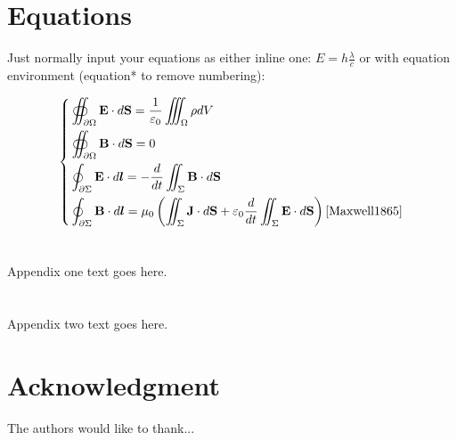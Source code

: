 \documentclass{article}
\begin{document}
\chapter{Equations}
Just normally input your equations as either inline one: $E=h\frac{\lambda}{c}$ or with equation environment (equation* to remove numbering):

\begin{equation}
\left\{
\begin{aligned}
    &\oiint_{\partial\Omega}{\mathbf{E}\cdot d\mathbf{S}}=\frac 1{\varepsilon_0}\iiint_\Omega{\rho dV}\\
    &\oiint_{\partial\Omega}{\mathbf{B}\cdot d\mathbf{S}}=0\\
    &\oint_{\partial\Sigma}{\mathbf{E}\cdot d\boldsymbol{l}}=-\frac d{dt} \iint_\Sigma{{\mathbf{B}\cdot d\mathbf{S}}}\\
    &\oint_{\partial\Sigma}{\mathbf{B}\cdot d\boldsymbol{l}}=\mu_0 \left(\iint_\Sigma{{\mathbf{J}\cdot d\mathbf{S}}}+\varepsilon_0\frac d{dt} \iint_\Sigma{{\mathbf{E}\cdot d\mathbf{S}}}\right)\cite{Maxwell1865}
\end{aligned}
\right.
\end{equation}

\newpage %

\begin{appendices}
\chapter{}
Appendix one text goes here.

\chapter{}
Appendix two text goes here.

\newpage %
\end{appendices}

\chapter*{Acknowledgment}
The authors would like to thank...

\newpage





\rhead{\small\sffamily\bfseries \bibname}
\end{document}
